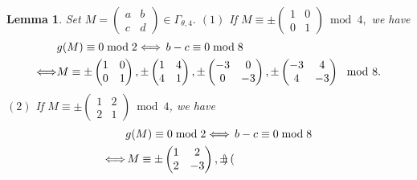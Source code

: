 \documentclass[12pt]{article}
\theoremstyle{definition}
\newtheorem{lemma}[theorem]{Lemma}
\numberwithin{equation}{section}
\numberwithin{theorem}{section}
\begin{document}
\begin{lemma}
\label{lem:level4-mod2}
{\it
Set 
$
M=
\begin{pmatrix}
a & b \\
c & d
\end{pmatrix}
\in\Gamma_{\theta,4}.
$
\newline
$\mathrm{(1)}$ If 
$
M
\equiv
\pm
\begin{pmatrix}
1 & 0 \\
0 & 1
\end{pmatrix}
\bmod{4},
$ 
we have 
\begin{align}
&g(M)\equiv 0 \bmod{2}  
\Longleftrightarrow
\, b-c \equiv 0 \bmod{8} \notag  \\
\Longleftrightarrow&
M
\equiv
\pm
\begin{pmatrix}
1 & 0 \\
0 & 1
\end{pmatrix}, 
\pm
\begin{pmatrix}
1 & 4 \\
4 & 1
\end{pmatrix}, 
\pm
\begin{pmatrix}
-3 & 0 \\
0 & -3
\end{pmatrix}, 
\pm
\begin{pmatrix}
-3 & 4 \\
4 & -3
\end{pmatrix}
\mod{8}.       \label{eqn:level4-mod2-pmI(1)}
\end{align}
$\mathrm{(2)}$ If 
$
M
\equiv
\pm
\begin{pmatrix}
1 & 2 \\
2 & 1
\end{pmatrix}
\bmod{4}
$, we have  
\begin{align}
 \label{eqn:level4-mod4-pmI(2)}
&g(M)\equiv 0 \bmod{2}  
\Longleftrightarrow
\, b-c\equiv 0 \bmod{8} \notag \\
\Longleftrightarrow& \, 
M
\equiv 
\pm
\begin{pmatrix}
1 & 2 \\
2 & -3
\end{pmatrix}, 
\pm
\begin{pmatrix}

\end{pmatrix}
\end{align}}
\end{lemma}
\end{document}
